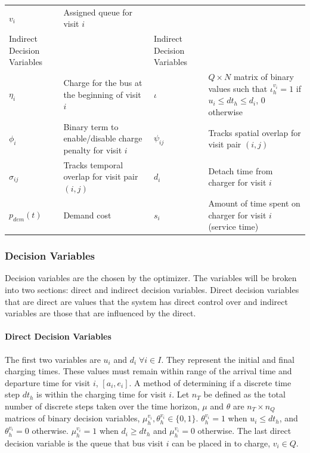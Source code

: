 \documentclass[11pt,a4paper,final]{article}
\newcommand{\Iset}{I}                       %
\newcommand{\Qset}{Q}                       %
\begin{document}
\begin{table}[htbp]
\begin{tabularx}{\textwidth}{L{0.3} L{1.2} L{0.3} L{1.2}}
\(v_i\) & Assigned queue for visit \(i\) &  & \\[0pt]
Indirect Decision Variables &  & Indirect Decision Variables & \\[0pt]
\(\eta_i\) & Charge for the bus at the beginning of visit \(i\) & \(\iota\) & \(Q \times N\) matrix of binary values such that \(\iota_h^{v_i} = 1\) if \(u_i \le dt_h \le d_i\), 0 otherwise\\[0pt]
\(\phi_i\) & Binary term to enable/disable charge penalty for visit \(i\) & \(\psi_{ij}\) & Tracks spatial overlap for visit pair \((i,j)\)\\[0pt]
\(\sigma_{ij}\) & Tracks temporal overlap for visit pair \((i,j)\) & \(d_i\) & Detach time from charger for visit \(i\)\\[0pt]
\(p_{dem}(t)\) & Demand cost & \(s_i\) & Amount of time spent on charger for visit \(i\) (service time)\\[0pt]
\hline
\end{tabularx}
\end{table}

\subsubsection{Decision Variables}
\label{sec:decision-variables}
Decision variables are the chosen by the optimizer. The variables will be broken into two sections: direct and indirect
decision variables. Direct decision variables that are direct are values that the system has direct control over and
indirect variables are those that are influenced by the direct.

\paragraph{Direct Decision Variables}
\label{sec:direct-decision-variables}
The first two variables are \(u_i\) and \(d_i \; \forall i \in \Iset\). They represent the initial and final charging times. These
values must remain within range of the arrival time and departure time for visit \(i\), \([a_i, e_i]\). A method of
determining if a discrete time step \(dt_h\) is within the charging time for visit \(i\). Let \(n_T\) be defined as the total
number of discrete steps taken over the time horizon, \(\mu\) and \(\theta\) are \(n_T \times n_Q\) matrices of binary decision variables,
\(\mu_h^{v_i}, \theta_h^{v_i} \in \{0, 1\}\). \(\theta_h^{v_i} = 1\) when \(u_i \le dt_h\), and \(\theta_h^{v_i} = 0\) otherwise. \(\mu_h^{v_i} = 1\)
when \(d_i \ge dt_h\) and \(\mu_h^{v_i} = 0\) otherwise. The last direct decision variable is the queue that bus visit \(i\) can
be placed in to charge, \(v_i \in \Qset\).
\end{document}
